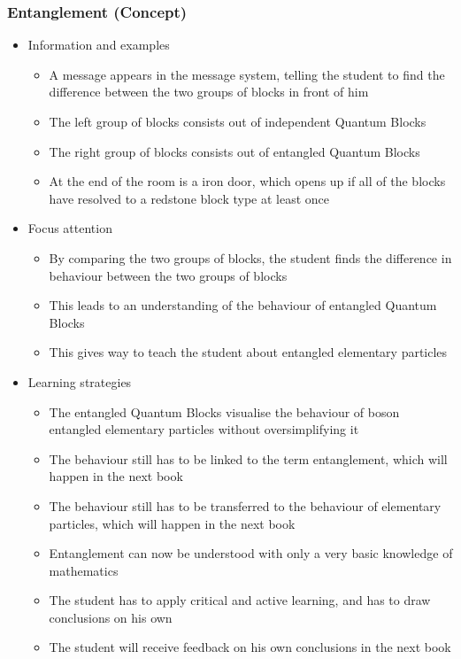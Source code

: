 \documentclass[11pt,twoside]{report} %
\begin{document}
\subsubsection{Entanglement (Concept)}
\begin{itemize}
	\item Information and examples
	\begin{itemize}
		\item A message appears in the message system, telling the student to find the difference between the two groups of blocks in front of him
		\item The left group of blocks consists out of independent Quantum Blocks
		\item The right group of blocks consists out of entangled Quantum Blocks
		\item At the end of the room is a iron door, which opens up if all of the blocks have resolved to a redstone block type at least once
	\end{itemize}
	\item Focus attention
	\begin{itemize}
		\item By comparing the two groups of blocks, the student finds the difference in behaviour between the two groups of blocks
		\item This leads to an understanding of the behaviour of entangled Quantum Blocks
		\item This gives way to teach the student about entangled elementary particles
	\end{itemize}
	\item Learning strategies
	\begin{itemize}
		\item The entangled Quantum Blocks visualise the behaviour of boson entangled elementary particles without oversimplifying it
		\item The behaviour still has to be linked to the term entanglement, which will happen in the next book
		\item The behaviour still has to be transferred to the behaviour of elementary particles, which will happen in the next book
		\item Entanglement can now be understood with only a very basic knowledge of mathematics
		\item The student has to apply critical and active learning, and has to draw conclusions on his own
		\item The student will receive feedback on his own conclusions in the next book

\end{itemize}
\end{itemize}
\end{document}
